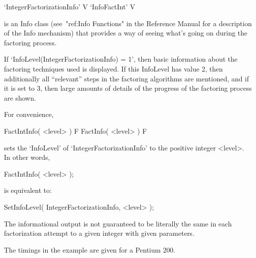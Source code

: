 

\>`IntegerFactorizationInfo' V
\>`InfoFactInt' V

is an Info class (see~"ref:Info Functions" in the {\GAP} Reference Manual
for a description of the Info mechanism) that provides a way of seeing
what's going on during the factoring process.

If `InfoLevel(IntegerFactorizationInfo) = 1', then basic information
about the factoring techniques used is displayed. If this InfoLevel has
value 2, then additionally all ``relevant'' steps in the factoring
algorithms are mentioned, and if it is set to 3, then large amounts of
details of the progress of the factoring process are shown. 

For convenience,

\>FactIntInfo( <level> ) F
\>FactInfo( <level> ) F

sets the `InfoLevel' of `IntegerFactorizationInfo' to the positive integer
<level>. In other words,

FactIntInfo( <level> );

is equivalent to:

SetInfoLevel( IntegerFactorizationInfo, <level> );

The informational output is not guaranteed to be literally the same in
each factorization attempt to a given integer with given parameters.

The timings in the example are given for a Pentium 200.

